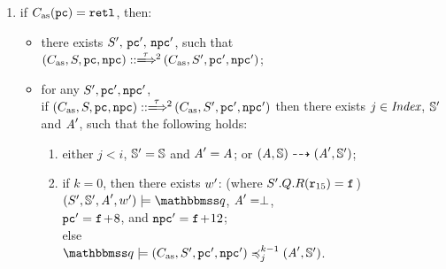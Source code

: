 \begin{definition}
\begin{enumerate}
        \item if $C_{\text{as}}(\texttt{pc}) = \texttt{retl}{}$, then: 
            \begin{itemize}
                \item there exists $S', \, \texttt{pc}', \, \texttt{npc}'$, 
                such that \\
                   $\LGlobMultiTrans{(\asmimp, \state, \pc, \npc)}
                       {\empmsg\,}{2}{(\asmimp, \state', \pc', \npc')}$;
                \item for any $S', \texttt{pc}', \texttt{npc}'$, \\
                    if $\LGlobMultiTrans{(\asmimp, \state, \pc, \npc)}
                            {\empmsg\,}{2}{(\asmimp, \state', \pc', \npc')}$
                    then there exists $j \in \textit{Index}$, $\mathbb{S}'$ and 
                    $\textit{A}'$, such that the following holds: 
                    \begin{enumerate}
                        \item either $j < i$, $\mathbb{S}' = \mathbb{S}$
                            and $\textit{A}' = \textit{A}$; or
                            ${(\textit{A}, \mathbb{S})} \dashrightarrow {(\textit{A}', \mathbb{S}')}$;
                        \item if $k = 0$, then there exists 
                        	$w'$: 
                        	(where $S'.Q.R(\texttt{r}_{15})
                        	 = \texttt{f}_{}$) \\
                            \hspace*{2em} 
                            $\asrtmodel{(\state', \hpstate', \primcom', \word')}
                                {\relastQ}$, 
                            $\textit{A}' = \perp$, \\
                            \hspace*{2em}
                            $\texttt{pc}' = \texttt{f}_{}\!+\!8$, and 
                            $\texttt{npc}' = \texttt{f}_{}\!+\!12$; \\
                            else \\
                            \hspace*{2em}
                            $\simFunctionSt{\relastQ}{(\asmimp, \state', \pc', \npc')}
                                {j}{k-1}{(\primcom', \hpstate')}$.
                    \end{enumerate}
            \end{itemize}
        
    \end{enumerate}
\end{definition}

